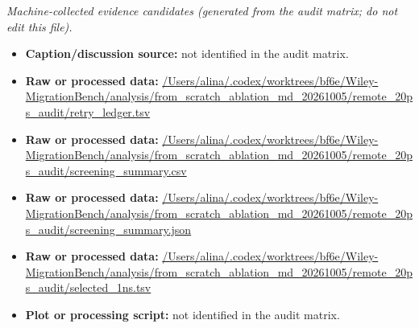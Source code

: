 \emph{Machine-collected evidence candidates (generated from the audit matrix; do not edit this file).}
\begin{itemize}[leftmargin=1.4em,noitemsep]
\item \textbf{Caption/discussion source:} not identified in the audit matrix.
\item \textbf{Raw or processed data:} \url{/Users/alina/.codex/worktrees/bf6e/Wiley-MigrationBench/analysis/from_scratch_ablation_md_20261005/remote_20ps_audit/retry_ledger.tsv}
\item \textbf{Raw or processed data:} \url{/Users/alina/.codex/worktrees/bf6e/Wiley-MigrationBench/analysis/from_scratch_ablation_md_20261005/remote_20ps_audit/screening_summary.csv}
\item \textbf{Raw or processed data:} \url{/Users/alina/.codex/worktrees/bf6e/Wiley-MigrationBench/analysis/from_scratch_ablation_md_20261005/remote_20ps_audit/screening_summary.json}
\item \textbf{Raw or processed data:} \url{/Users/alina/.codex/worktrees/bf6e/Wiley-MigrationBench/analysis/from_scratch_ablation_md_20261005/remote_20ps_audit/selected_1ns.tsv}
\item \textbf{Plot or processing script:} not identified in the audit matrix.
\end{itemize}

